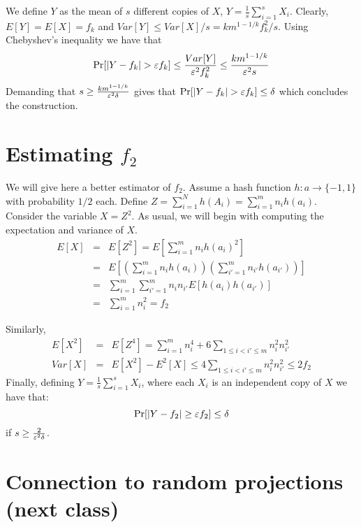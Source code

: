 \documentclass{article}
\begin{document}
We define $Y$ as the mean of $s$ different copies of $X$, $Y = \frac{1}{s}\sum_{i=1}^{s}X_i$.
Clearly, $E[Y] = E[X] = f_k$ and $Var[Y] \le Var[X]/s =  km^{1-1/k}f_{k}^{2}/s$.
Using Chebyshev's inequality we have that 
\[
\Pr[|Y - f_k| > \varepsilon f_k] \le \frac{Var[Y]}{\varepsilon^2 f_{k}^{2}} \le \frac{km^{1-1/k}}{\varepsilon^2 s} 
\]
Demanding that $ s \ge \frac{km^{1-1/k}}{\varepsilon^2 \delta}$ gives that $\Pr[|Y - f_k| > \varepsilon f_k] \le \delta$ which concludes the construction.







\section*{Estimating $f_2$}
We will give here a better estimator of $f_2$.
Assume a hash function $h:a\rightarrow \{-1,1\}$ with probability $1/2$ each.
Define $Z = \sum_{i=1}^{N}h(A_i) = \sum_{i=1}^{m}n_i h(a_i)$.
Consider the variable $X = Z^2$. As usual, we will begin with computing the expectation and variance of $X$.
\begin{eqnarray*}
E[X] &=& E[Z^2] = E[\sum_{i=1}^{m}n_i h(a_i)^2]\\
&=& E[(\sum_{i=1}^{m}n_i h(a_i))(\sum_{i'=1}^{m}n_{i'} h(a_{i'}))]\\
&=& \sum_{i=1}^{m}\sum_{i'=1}^{m}n_i n_{i'} E[h(a_{i}) h(a_{i'})]\\
&=& \sum_{i=1}^{m} n_{i}^{2} = f_2
\end{eqnarray*}
 
Similarly,
\begin{eqnarray*}
E[X^2] &=& E[Z^4] = \sum_{i=1}^{m} n_{i}^{4} + 6\sum_{1\le i < i' \le m} n_{i}^{2}n_{i'}^{2}\\
Var[X] &=& E[X^2] - E^2[X] \le 4\sum_{1\le i < i' \le m} n_{i}^{2}n_{i'}^{2} \le 2f_2
\end{eqnarray*}
Finally, defining $Y = \frac{1}{s}\sum_{i=1}^{s}X_i$, where each $X_i$ is an independent copy of $X$ we have that:
\[
\Pr[|Y -f_2| \ge \varepsilon f_2] \le \delta
\]
if $s \ge \frac{2}{\varepsilon^2 \delta}$.

\section*{Connection to random projections (next class)}
  
\end{document}

